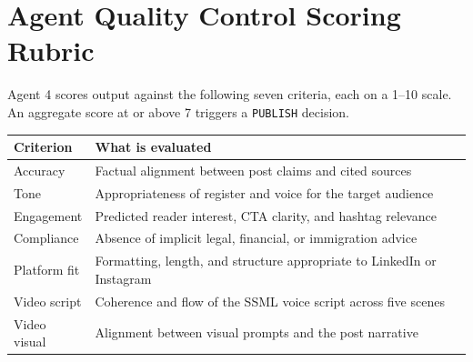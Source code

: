 \documentclass[12pt, letterpaper]{article}
\begin{document}
\section{Agent Quality Control Scoring Rubric}

Agent 4 scores output against the following seven criteria, each on a 1--10 scale.
An aggregate score at or above 7 triggers a \texttt{PUBLISH} decision.

\begin{center}
\begin{tabularx}{\textwidth}{lX}
\toprule
\textbf{Criterion} & \textbf{What is evaluated} \\
\midrule
Accuracy       & Factual alignment between post claims and cited sources \\
Tone           & Appropriateness of register and voice for the target audience \\
Engagement     & Predicted reader interest, CTA clarity, and hashtag relevance \\
Compliance     & Absence of implicit legal, financial, or immigration advice \\
Platform fit   & Formatting, length, and structure appropriate to LinkedIn or Instagram \\
Video script   & Coherence and flow of the SSML voice script across five scenes \\
Video visual   & Alignment between visual prompts and the post narrative \\
\bottomrule
\end{tabularx}
\end{center}
\end{document}

